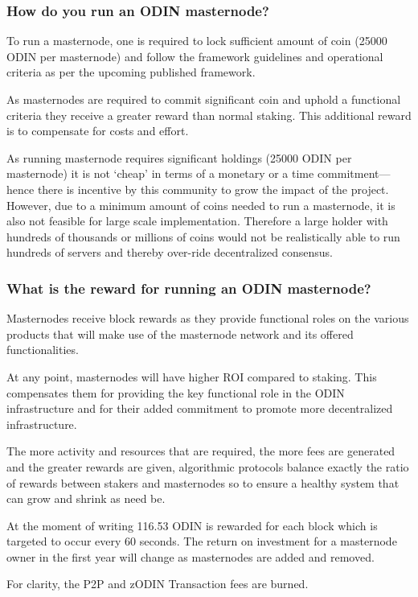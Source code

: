 \subsubsection{How do you run an ODIN masternode?}
To run a masternode, one is required to lock sufficient amount of coin (\num{25000} ODIN per masternode) and follow the framework guidelines and operational criteria as per the upcoming published framework.

As masternodes are required to commit significant coin and uphold a functional criteria they receive a greater reward than normal staking.  This additional reward is to compensate for costs and effort. 

As running masternode requires significant holdings (\num{25000} ODIN per masternode) it is not `cheap' in terms of a monetary or a time commitment---hence there is incentive by this community to grow the impact of the project. However, due to a minimum amount of coins needed to run a masternode, it is also not feasible for large scale implementation. Therefore a large holder with hundreds of thousands or millions of coins would not be realistically able to run hundreds of servers and thereby over-ride decentralized consensus.  

\subsubsection{What is the reward for running an ODIN masternode?}
Masternodes receive block rewards as they provide functional roles on the various products that will make use of the masternode network and its offered functionalities. 
 
At any point, masternodes will have higher ROI compared to staking. This compensates them for providing the key functional role in the ODIN infrastructure and for their added commitment to promote more decentralized infrastructure.

The more activity and resources that are required, the more fees are generated and the greater rewards are given, algorithmic protocols balance exactly the ratio of rewards between stakers and masternodes so to ensure a healthy system that can grow and shrink as need be.

At the moment of writing 116.53 ODIN is rewarded for each block which is targeted to occur every 60 seconds. The return on investment for a masternode owner in the first year will change as masternodes are added and removed.

For clarity, the P2P and zODIN Transaction fees are burned.

